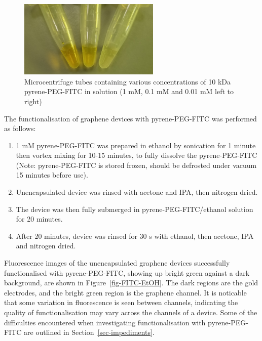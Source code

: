 \documentclass[
  a4paper,
]{scrbook}
\begin{document}
\begin{figure}

{\centering \includegraphics[width=0.6\textwidth,height=\textheight]{figures/ch6/PPF_vials.png}

}

\caption{\label{fig-PPF-concs}Microcentrifuge tubes containing various
concentrations of 10 kDa pyrene-PEG-FITC in solution (1 mM, 0.1 mM and
0.01 mM left to right)}

\end{figure}

The functionalisation of graphene devices with pyrene-PEG-FITC was
performed as follows:

\begin{enumerate}
\def\labelenumi{\arabic{enumi}.}
\item
  1 mM pyrene-PEG-FITC was prepared in ethanol by sonication for 1
  minute then vortex mixing for 10-15 minutes, to fully dissolve the
  pyrene-PEG-FITC (Note: pyrene-PEG-FITC is stored frozen, should be
  defrosted under vacuum 15 minutes before use).
\item
  Unencapsulated device was rinsed with acetone and IPA, then nitrogen
  dried.
\item
  The device was then fully submerged in pyrene-PEG-FITC/ethanol
  solution for 20 minutes.
\item
  After 20 minutes, device was rinsed for 30 s with ethanol, then
  acetone, IPA and nitrogen dried.
\end{enumerate}

Fluorescence images of the unencapsulated graphene devices successfully
functionalised with pyrene-PEG-FITC, showing up bright green against a
dark background, are shown in Figure~\ref{fig-FITC-EtOH}. The dark
regions are the gold electrodes, and the bright green region is the
graphene channel. It is noticable that some variation in fluorescence is
seen between channels, indicating the quality of functionalisation may
vary across the channels of a device. Some of the difficulties
encountered when investigating functionalisation with pyrene-PEG-FITC
are outlined in Section~\ref{sec-impediments}.
\end{document}
